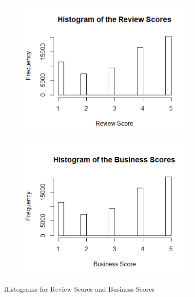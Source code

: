 \documentclass[12pt]{article}
\begin{document}
	\begin{figure}[h!]
		\centering
		\begin{subfigure}
			\centering
			\includegraphics[scale=0.6]{Review_Summary.png}
		\end{subfigure}%
		\begin{subfigure}
			\centering
			\includegraphics[scale=0.6]{Business_Summary.png}
		\end{subfigure}%
		\caption{Histograms for Review Scores and Business Scores}
		\label{Figure:hist}
	\end{figure}
	
	
\end{document}
